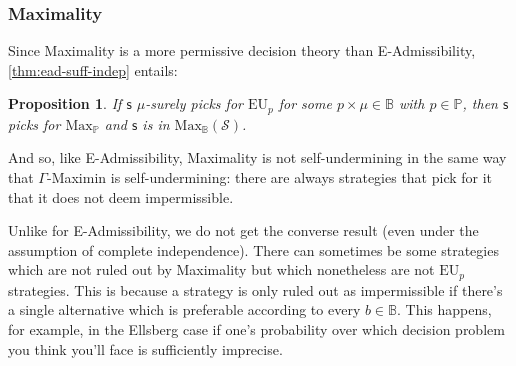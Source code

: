 \documentclass[a4paper]{article}
\newtheorem{proposition}[theorem]{Proposition}
\newcommand\s{\mathsf{s}}
\renewcommand\P{\mathbb{P}} %
\newcommand\EU{\mathrm{EU}}
\newcommand\EAd{\mathrm{EAd}}
\newcommand\Maximality{\mathrm{Max}}
\newcommand{\IB}{\mathbb{B}}
\newcommand{\IP}{\P}
\newcommand{\pb}{b}
\renewcommand{\color}[1]{}
\newcommand{\Strategies}{\mathcal{S}}
\newenvironment{CCM rewritten}
{\begingroup\color{blue}} %
{\endgroup}              %
\begin{document}
{	\subsubsection{Maximality}
	
	
{\color{red} Since Maximality is a more permissive decision theory than E-Admissibility, \cref{thm:ead-suff-indep} entails:


 \begin{proposition}\label{thm:max-suff}
	If $\s$ $\mu$-surely picks for $\EU_p$ for some $p\times \mu\in \IB$ with $p\in\IP$, then $\s$ picks for $\Maximality_\IP$ and $\s$ is in $\Maximality_\IB(\Strategies)$.
%	
\end{proposition}}
 

\begin{comment}
Since Maximality is a more permissive decision theory than E-Admissibility, \cref{thm:ead-equiv[indep]} entails:



\begin{proposition}\label{thm:max-suff}
	If $\s$ picks for $\EU_p$, for some $p$ in $\IP$ with some $p\times \mu\in \IB$, then $\s$ picks for $\Maximality_\IP$ and $\s$ is in $\Maximality_\IB(\Strategies)$.
%	
\end{proposition}
\end{comment}

And so, like E-Admissibility, Maximality is not self-undermining in the same way that $\Gamma$-Maximin is self-undermining: there are always strategies that pick for it that it does not deem impermissible.

Unlike for E-Admissibility, we do not get the converse result (even under the assumption of complete independence). There can sometimes be some strategies which are not ruled out by Maximality but which nonetheless are not $\EU_p$ strategies. This is because a strategy is only ruled out as impermissible if there's a single alternative which is preferable according to every $\pb\in \IB$. 
This happens, for example, in the Ellsberg case if one's probability over which decision problem you think you'll face is sufficiently imprecise.

}
\end{document}
